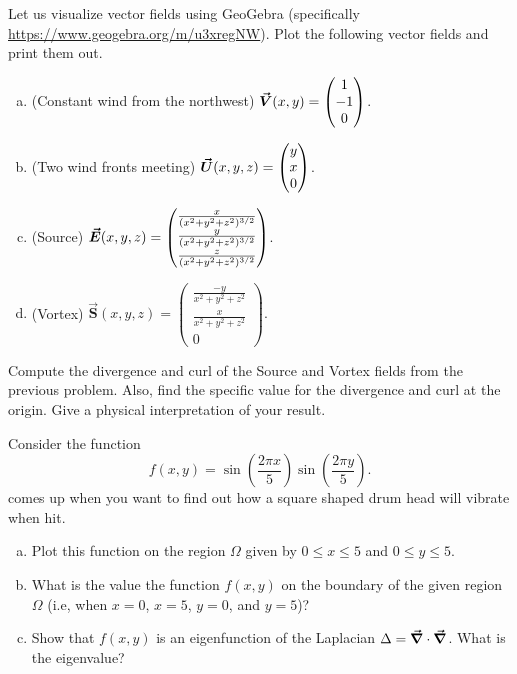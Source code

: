 \documentclass[12pt]{article} %
\begin{document}
\begin{problem} 
Let us visualize vector fields using GeoGebra (specifically \url{https://www.geogebra.org/m/u3xregNW}). Plot the following vector fields and print them out. 
\begin{enumerate}[(a)]
    \item (Constant wind from the northwest) $\boldsymbol{\vec{V}}(x,y)=\begin{pmatrix} 1 \\ -1 \\ 0\end{pmatrix}$.
        \item (Two wind fronts meeting) $\boldsymbol{\vec{U}}(x,y,z)=\begin{pmatrix} y \\ x \\ 0 \end{pmatrix}$.
                        \item (Source) $\boldsymbol{\vec{E}}(x,y,z) = \begin{pmatrix} \frac{x}{(x^2+y^2+z^2)^{3/2}} \\ \frac{y}{(x^2+y^2+z^2)^{3/2}} \\ \frac{z}{(x^2+y^2+z^2)^{3/2}} \end{pmatrix}$.
                  \item (Vortex) $\boldsymbol{\vec{S}}(x,y,z)=\begin{pmatrix} \frac{-y}{x^2+y^2+z^2} \\ \frac{x}{x^2+y^2+z^2} \\ 0\end{pmatrix}.$           
\end{enumerate}
\end{problem}

\begin{problem}
Compute the divergence and curl of the Source and Vortex fields from the previous problem.  Also, find the specific value for the divergence and curl at the origin. Give a physical interpretation of your result.
\end{problem}

\begin{problem}
Consider the function
\[
f(x,y)=\sin\left(\frac{2\pi x}{5}\right)\sin\left(\frac{2\pi y}{5}\right).
\]
comes up when you want to find out how a square shaped drum head will vibrate when hit. 
\begin{enumerate}[(a)]
    \item Plot this function on the region $\Omega$ given by $0\leq x \leq 5$ and $0\leq y \leq 5$.  
    \item What is the value the function $f(x,y)$ on the boundary of the given region $\Omega$ (i.e, when $x=0$, $x=5$, $y=0$, and $y=5$)?
    \item Show that $f(x,y)$ is an eigenfunction of the Laplacian $\Delta = \boldsymbol{\vec{\nabla}} \cdot \boldsymbol{\vec{\nabla}}$. What is the eigenvalue?
\end{enumerate}
\end{problem}
\end{document}

